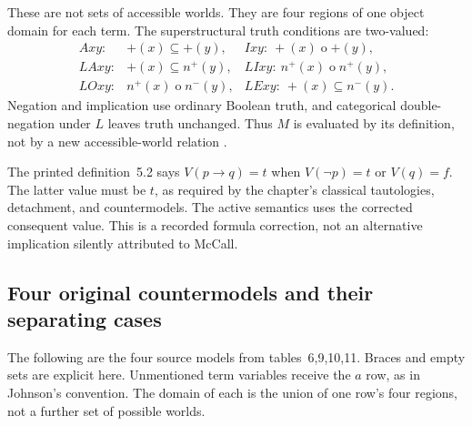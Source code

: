 These are not sets of accessible worlds. They are four regions of one object
domain for each term. The superstructural truth conditions are two-valued:
\[
\begin{array}{lll}
Axy:&+(x)\subseteq +(y),& Ixy:\ +(x)\mathbin{o}+(y),\\
LAxy:&+(x)\subseteq n^{+}(y),& LIxy:\ n^{+}(x)\mathbin{o}n^{+}(y),\\
LOxy:&n^{+}(x)\mathbin{o}n^{-}(y),& LExy:\ +(x)\subseteq n^{-}(y).
\end{array}
\]
Negation and implication use ordinary Boolean truth, and categorical
double-negation under \(L\) leaves truth unchanged. Thus \(M\) is evaluated
by its definition, not by a new accessible-world relation
\parencite[pp.~271--276]{Johnson2004ModalSyllogisms}.

The printed definition~5.2 says \(V(p\to q)=t\) when \(V(\neg p)=t\)
or \(V(q)=f\). The latter value must be \(t\), as required by the chapter's
classical tautologies, detachment, and countermodels. The active semantics
uses the corrected consequent value. This is a recorded formula correction,
not an alternative implication silently attributed to McCall.

\subsection{Four original countermodels and their separating cases}
\label{sec:p13-johnson-mccall-countermodels}

The following are the four source models from tables~6,9,10,11. Braces and
empty sets are explicit here. Unmentioned term variables receive the \(a\)
row, as in Johnson's convention. The domain of each is the union of one
row's four regions, not a further set of possible worlds.

